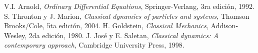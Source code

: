 \documentclass[a4paper,10pt]{article}
\numberwithin{equation}{section}
\begin{document}
\begin{thebibliography}{10}
 V.I. Arnold, \emph{Ordinary Differential Equations}, Springer-Verlang,
 3ra edición, 1992.
 S. Thronton y J. Marion, \textit{Classical dynamics of particles and systems}, Thomson Brooks/Cole,
 5ta edición, 2004.
 H. Goldstein, \emph{Classical Mechanics}, Addison-Wesley, 2da edición,
 1980.
 J. José y E. Saletan, \emph{Classical dynamics: A contemporary approach}, Cambridge University Press,
 1998.
\end{thebibliography}
\end{document}

